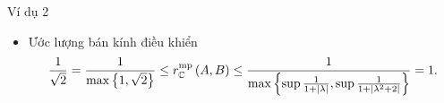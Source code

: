 \begin{frame}{Ví dụ 2}
    \begin{itemize}
        \item Ước lượng bán kính điều khiển
        \begin{align}
        \frac{1}{\sqrt{2}}=\frac{1}{\max\left\{ 1,\sqrt{2}\right\} }\le r_{\mathbb{C}}^{\text{mp}}\left(A,B\right)\le\frac{1}{\max\left\{ \sup\frac{1}{1+\left|\lambda\right|},\sup\frac{1}{1+\left|\lambda^{2}+2\right|}\right\} }=1.
        \end{align}
    \end{itemize}
\end{frame}